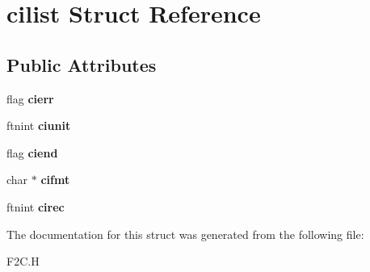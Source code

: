 \hypertarget{structcilist}{\section{cilist Struct Reference}
\label{structcilist}
}
\subsection*{Public Attributes}
\begin{DoxyCompactItemize}
\item 
\hypertarget{structcilist_aaa609be8bdf78a8fc7ba35b2ed0e6083}{flag {\bfseries cierr}}\label{structcilist_aaa609be8bdf78a8fc7ba35b2ed0e6083}

\item 
\hypertarget{structcilist_a3e5d0438673d14f5889fb6a3e712a076}{ftnint {\bfseries ciunit}}\label{structcilist_a3e5d0438673d14f5889fb6a3e712a076}

\item 
\hypertarget{structcilist_af16867fbc88cc3b26ecdedd0259fc5f5}{flag {\bfseries ciend}}\label{structcilist_af16867fbc88cc3b26ecdedd0259fc5f5}

\item 
\hypertarget{structcilist_a8c5159e1728cd9954138ecb392f04b8c}{char $\ast$ {\bfseries cifmt}}\label{structcilist_a8c5159e1728cd9954138ecb392f04b8c}

\item 
\hypertarget{structcilist_ace7c117f446a91e75e9f920fcff86546}{ftnint {\bfseries cirec}}\label{structcilist_ace7c117f446a91e75e9f920fcff86546}

\end{DoxyCompactItemize}


The documentation for this struct was generated from the following file\+:\begin{DoxyCompactItemize}
\item 
F2\+C.\+H\end{DoxyCompactItemize}
